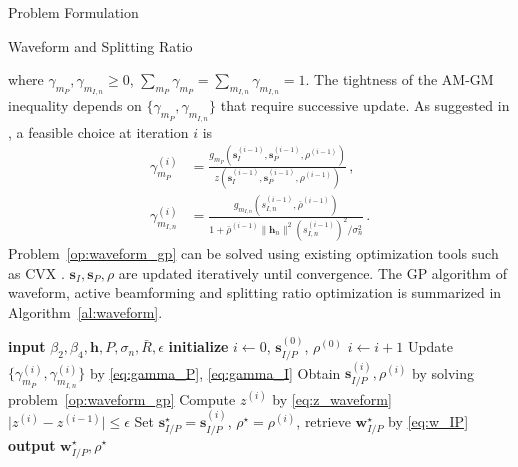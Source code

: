 \documentclass[journal]{IEEEtran}
\begin{document}
\begin{section}{Problem Formulation}
\begin{subsection}{Waveform and Splitting Ratio}
\begin{mini!}
			\end{mini!}
			where $\gamma_{m_P},\gamma_{m_{I,n}} \ge 0$, $\sum_{m_P}\gamma_{m_P}=\sum_{m_{I,n}}\gamma_{m_{I,n}}=1$. The tightness of the AM-GM inequality depends on $\{\gamma_{m_P},\gamma_{m_{I,n}}\}$ that require successive update. As suggested in \cite{Clerckx2018b}, a feasible choice at iteration $i$ is
			\begin{align}
				\gamma_{m_P}^{(i)} & = \frac{g_{m_P}(\boldsymbol{s}_I^{(i-1)},\boldsymbol{s}_P^{(i-1)},\rho^{(i-1)})}{z(\boldsymbol{s}_I^{(i-1)},\boldsymbol{s}_P^{(i-1)},\rho^{(i-1)})}\label{eq:gamma_P}\,,\\
				\gamma_{m_{I,n}}^{(i)} & = \frac{g_{m_{I,n}}(s_{I,n}^{(i-1)},\bar{\rho}^{(i-1)})}{1+{\bar{\rho}^{(i-1)}\lVert{\boldsymbol{h}_n}\rVert^2 (s_{I,n}^{(i-1)})^2}\big/{\sigma_n^2}}\,.\label{eq:gamma_I}
			\end{align}
			Problem~\ref{op:waveform_gp} can be solved using existing optimization tools such as CVX \cite{Grant2013}. $\boldsymbol{s}_I,\boldsymbol{s}_P,\rho$ are updated iteratively until convergence. The GP algorithm of waveform, active beamforming and splitting ratio optimization is summarized in Algorithm~\ref{al:waveform}.
			\begin{algorithm}[!t]
				\caption{GP: Waveform, Active Beamforming and Splitting Ratio.}
				\label{al:waveform}
				\begin{algorithmic}[1]
					\State \textbf{input} $\beta_2,\beta_4,\boldsymbol{h},P,\sigma_n,\bar{R},\epsilon$
					\State \textbf{initialize} $i \gets 0$, $\boldsymbol{s}_{I/P}^{(0)}$, $\rho^{(0)}$
					\Repeat
						\State $i \gets i + 1$
						\State Update $\{\gamma_{m_P}^{(i)},\gamma_{m_{I,n}}^{(i)}\}$ by \ref{eq:gamma_P}, \ref{eq:gamma_I}
						\State Obtain $\boldsymbol{s}_{I/P}^{(i)},\rho^{(i)}$ by solving problem~\ref{op:waveform_gp}
						\State Compute $z^{(i)}$ by \ref{eq:z_waveform}
					\Until $\lvert z^{(i)} - z^{(i-1)} \rvert \le \epsilon$
					\State Set $\boldsymbol{s}_{I/P}^{\star}=\boldsymbol{s}_{I/P}^{(i)}$, $\rho^{\star}=\rho^{(i)}$, retrieve $\boldsymbol{w}_{I/P}^{\star}$ by \ref{eq:w_IP}
					\State \textbf{output} $\boldsymbol{w}_{I/P}^{\star}, \rho^{\star}$
				\end{algorithmic}
			\end{algorithm}
		\end{subsection}



\end{section}
\end{document}
